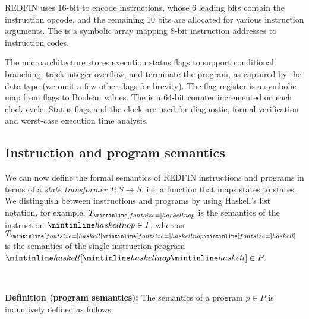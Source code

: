 REDFIN uses 16-bit  to encode instructions, whose 6
leading bits contain the instruction opcode, and the remaining 10 bits are
allocated for various instruction arguments. The  is a symbolic
array mapping 8-bit instruction addresses to instruction codes.

The microarchitecture stores execution status flags to support conditional
branching, track integer overflow, and terminate the program, as captured by the
data type  (we omit a few other flags for brevity). The flag register is a
symbolic map from flags to Boolean values. The  is a 64-bit counter
incremented on each clock cycle. Status flags and the clock are used for
diagnostic, formal verification and worst-case execution time analysis.

\subsection{Instruction and program semantics}

We can now define the formal semantics of REDFIN instructions and programs in terms
of a \emph{state transformer} $T : S \rightarrow S$, i.e. a function that maps
states to states. We distinguish between instructions and programs by using
Haskell's list notation, for example, $T_{\subhs{nop}}$ is the semantics of the
instruction $\hs{nop} \in I$, whereas $T_{\subhs{[}\subhs{nop}\subhs{]}}$ is the
semantics of the single-instruction program $\hs{[}\hs{nop}\hs{]} \in P$.


\vspace{-2mm}
\noindent\hrulefill~\\
\vspace{-4mm}

\noindent
\textbf{Definition (program semantics):} The semantics of a program $p \in P$
is inductively defined as follows:


